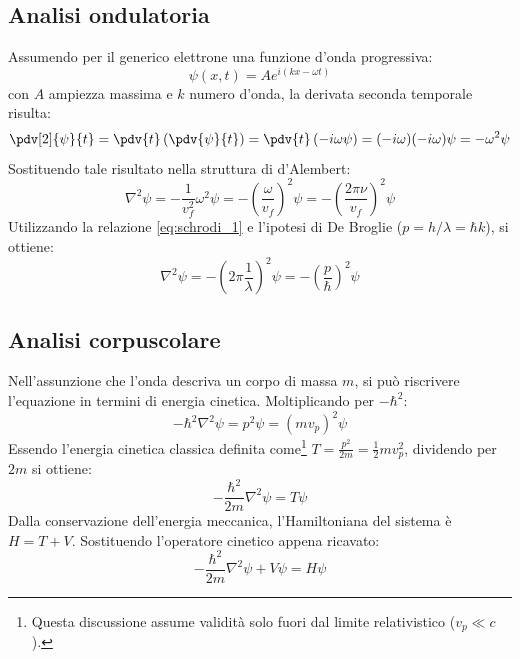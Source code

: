 \documentclass[a4paper,11pt]{report}
\begin{document}
\subsection{Analisi ondulatoria}
Assumendo per il generico elettrone una funzione d'onda progressiva:
\begin{equation}
    \psi(x,t) = A e^{i(kx-\omega t)}
\end{equation}
con $A$ ampiezza massima e $k$ numero d'onda, la derivata seconda temporale risulta:
\begin{equation}
    \pdv[2]{\psi}{t} = \pdv{t}\left( \pdv{\psi}{t} \right) = \pdv{t}\left( -i\omega \psi \right) = (-i\omega)(-i\omega)\psi = -\omega^2\psi
\end{equation}
Sostituendo tale risultato nella struttura di d'Alembert:
\begin{equation}
    \nabla^2 \psi = - \frac{1}{v_f^2} \omega^2\psi = -\left( \frac{\omega}{v_f} \right)^2\psi = -\left( \frac{2\pi\nu}{v_f} \right)^2\psi
\end{equation}
Utilizzando la relazione \eqref{eq:schrodi_1} e l'ipotesi di De Broglie ($p = h/\lambda = \hbar k$), si ottiene:
\begin{equation}
    \nabla^2 \psi = -\left(2\pi \frac{1}{\lambda} \right)^2\psi = -\left( \frac{p}{\hbar} \right)^2\psi
\end{equation}

\subsection{Analisi corpuscolare}
Nell'assunzione che l'onda descriva un corpo di massa $m$, si può riscrivere l'equazione in termini di energia cinetica. Moltiplicando per $-\hbar^2$:
\begin{equation}
    -\hbar^2 \nabla^2 \psi = p^2 \psi = (mv_p)^2 \psi
\end{equation}
Essendo l'energia cinetica classica definita come\footnote{Questa discussione assume validità solo fuori dal limite relativistico ($v_p \ll c$).} $T = \frac{p^2}{2m} = \frac{1}{2}mv_p^2$, dividendo per $2m$ si ottiene:
\begin{equation}
    -\frac{\hbar^2}{2m}\nabla^2 \psi = T\psi
\end{equation}
Dalla conservazione dell'energia meccanica, l'Hamiltoniana del sistema è $H = T + V$. Sostituendo l'operatore cinetico appena ricavato:
\begin{equation}
    -\frac{\hbar^2}{2m} \nabla^2 \psi + V\psi = H\psi
    \label{eq:schrodi_2}
\end{equation}
\end{document}
